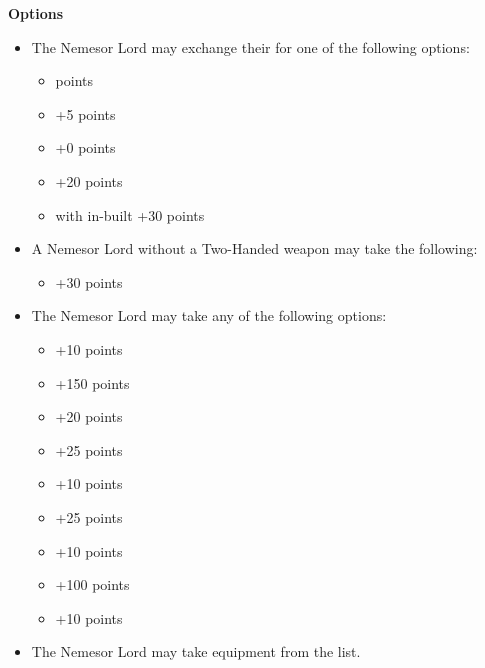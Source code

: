 \begin{minipage}[t]{0.72\textwidth}
	\vspace*{2em}
	\textbf{Options}
	\begin{itemize}
		\item The Nemesor Lord may exchange their  for one of the following options:
		\begin{itemize}			
			\item {}  points
			\item {} \dotfill +5 points
			\item {} \dotfill +0 points
			\item {} \dotfill +20 points
			\item {} with in-built  \dotfill +30 points
		\end{itemize}
		\item A Nemesor Lord without a Two-Handed weapon may take the following:
		\begin{itemize}
			\item {} \dotfill +30 points
		\end{itemize}
		\item The Nemesor Lord may take any of the following options:
		\begin{itemize}
			\item {} \dotfill +10 points
			\item {} \dotfill +150 points
			\item {} \dotfill +20 points
			\item {} \dotfill +25 points
			\item {} \dotfill +10 points
			\item {} \dotfill +25 points
			\item {} \dotfill +10 points
			\item {} \dotfill +100 points
			\item {} \dotfill +10 points
		\end{itemize}
		\item The Nemesor Lord may take equipment from the  list.
	\end{itemize}
\end{minipage}
\hspace{0.5em}



